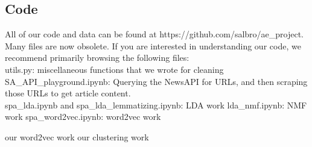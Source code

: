 \documentclass[11pt]{article}
\begin{document}
\subsection{Code}
All of our code and data can be found at https://github.com/salbro/ae_project.  Many files are now obsolete. If you are interested in understanding our code, we recommend primarily browsing the following files: \\
utils.py: miscellaneous functions that we wrote for cleaning
SA_API_playground.ipynb: Querying the NewsAPI for URLs, and then scraping those URLs to get article content. \\
spa_lda.ipynb and spa_lda_lemmatizing.ipynb: LDA work
lda_nmf.ipynb: NMF work
spa_word2vec.ipynb: word2vec work


our word2vec work
our clustering work

 
\end{document}
